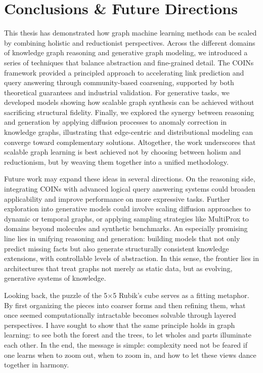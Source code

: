 \chapter{Conclusions \& Future Directions}
\label{chp: conclusion}

This thesis has demonstrated how graph machine learning methods can be scaled by combining holistic and reductionist perspectives. Across the different domains of knowledge graph reasoning and generative graph modeling, we introduced a series of techniques that balance abstraction and fine-grained detail. The COINs framework provided a principled approach to accelerating link prediction and query answering through community-based coarsening, supported by both theoretical guarantees and industrial validation. For generative tasks, we developed models showing how scalable graph synthesis can be achieved without sacrificing structural fidelity. Finally, we explored the synergy between reasoning and generation by applying diffusion processes to anomaly correction in knowledge graphs, illustrating that edge-centric and distributional modeling can converge toward complementary solutions. Altogether, the work underscores that scalable graph learning is best achieved not by choosing between holism and reductionism, but by weaving them together into a unified methodology.

Future work may expand these ideas in several directions. On the reasoning side, integrating COINs with advanced logical query answering systems could broaden applicability and improve performance on more expressive tasks. Further exploration into generative models could involve scaling diffusion approaches to dynamic or temporal graphs, or applying sampling strategies like MultiProx to domains beyond molecules and synthetic benchmarks. An especially promising line lies in unifying reasoning and generation: building models that not only predict missing facts but also generate structurally consistent knowledge extensions, with controllable levels of abstraction. In this sense, the frontier lies in architectures that treat graphs not merely as static data, but as evolving, generative systems of knowledge.

Looking back, the puzzle of the 5×5 Rubik’s cube serves as a fitting metaphor. By first organizing the pieces into coarser forms and then refining them, what once seemed computationally intractable becomes solvable through layered perspectives. I have sought to show that the same principle holds in graph learning: to see both the forest and the trees, to let wholes and parts illuminate each other. In the end, the message is simple: complexity need not be feared if one learns when to zoom out, when to zoom in, and how to let these views dance together in harmony.
